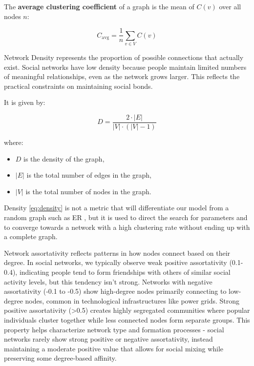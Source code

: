 \documentclass[runningheads]{llncs}
\begin{document}
The \textbf{average clustering coefficient} of a graph is the mean of $C(v)$ over all nodes $n$:

\begin{equation}
C_{\text{avg}} = \frac{1}{n} \sum_{v \in V} C(v)
\label{eq:average_clustering}
\end{equation}

Network Density represents the proportion of possible connections that actually exist. Social networks have low density because people maintain limited numbers of meaningful relationships, even as the network grows larger. This reflects the practical constraints on maintaining social bonds.

It is given by:

\begin{equation}
D = \frac{2 \cdot |E|}{|V| \cdot (|V| - 1)}
\label{eq:density}
\end{equation}

where:
\begin{itemize}
    \item $D$ is the density of the graph,
    \item $|E|$ is the total number of edges in the graph,
    \item $|V|$ is the total number of nodes in the graph.
\end{itemize}

Density \ref{eq:density} is not a metric that will differentiate our model from a random graph such as ER \cite{erdos1959random}, but it is used to direct the search for parameters and to converge towards a network with a high clustering rate without ending up with a complete graph. 

Network assortativity reflects patterns in how nodes connect based on their degree. In social networks, we typically observe weak positive assortativity (0.1-0.4), indicating people tend to form friendships with others of similar social activity levels, but this tendency isn't strong. Networks with negative assortativity (-0.1 to -0.5) show high-degree nodes primarily connecting to low-degree nodes, common in technological infrastructures like power grids. Strong positive assortativity (>0.5) creates highly segregated communities where popular individuals cluster together while less connected nodes form separate groups. This property helps characterize network type and formation processes - social networks rarely show strong positive or negative assortativity, instead maintaining a moderate positive value that allows for social mixing while preserving some degree-based affinity.
\end{document}
